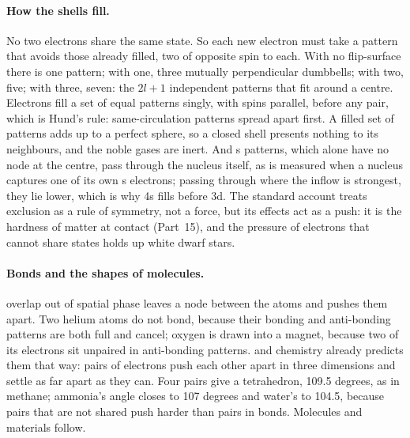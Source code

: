\documentclass[11pt,a4paper]{article}
\begin{document}
\paragraph{How the shells fill.} No two electrons share the same state.  So each new electron must take a pattern that avoids those already filled, two of opposite spin to each. With no flip-surface there is one pattern; with one, three mutually perpendicular dumbbells; with two, five; with three, seven: the $2l+1$ independent patterns that fit around a centre.  Electrons fill a set of equal patterns singly, with spins parallel, before any pair, which is Hund's rule: same-circulation patterns spread apart first. A filled set of patterns adds up to a perfect sphere, so a closed shell presents nothing to its neighbours, and the noble gases are inert. And s patterns, which alone have no node at the centre, pass through the nucleus itself, as is measured when a nucleus captures one of its own s electrons; passing through where the inflow is strongest, they lie lower, which is why 4s fills before 3d. The standard account treats exclusion as a rule of symmetry, not a force, but its effects act as a push: it is the hardness of matter at contact (Part~15), and the pressure of electrons that cannot share states holds up white dwarf stars.

\paragraph{Bonds and the shapes of molecules.}  overlap out of spatial phase leaves a node between the atoms and pushes them apart. Two helium atoms do not bond, because their bonding and anti-bonding patterns are both full and cancel; oxygen is drawn into a magnet, because two of its electrons sit unpaired in anti-bonding patterns.  and chemistry already predicts them that way: pairs of electrons push each other apart in three dimensions and settle as far apart as they can. Four pairs give a tetrahedron, 109.5 degrees, as in methane; ammonia's angle closes to 107 degrees and water's to 104.5, because pairs that are not shared push harder than pairs in bonds. Molecules and materials follow.
\end{document}
